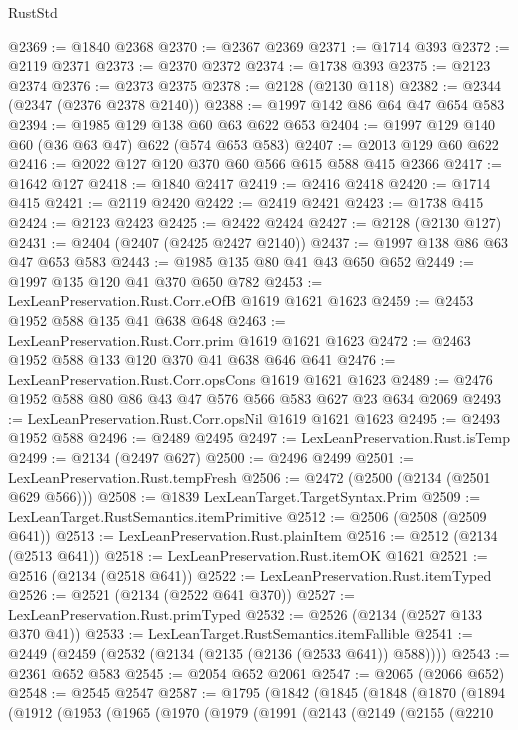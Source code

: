 \begin{lexlean}{RustStd}
\begin{coremodule}
@2369 := @1840 @2368
@2370 := @2367 @2369
@2371 := @1714 @393
@2372 := @2119 @2371
@2373 := @2370 @2372
@2374 := @1738 @393
@2375 := @2123 @2374
@2376 := @2373 @2375
@2378 := @2128 (@2130 @118)
@2382 := @2344 (@2347 (@2376 @2378 @2140))
@2388 := @1997 @142 @86 @64 @47 @654 @583
@2394 := @1985 @129 @138 @60 @63 @622 @653
@2404 := @1997 @129 @140 @60 (@36 @63 @47) @622 (@574 @653 @583)
@2407 := @2013 @129 @60 @622
@2416 := @2022 @127 @120 @370 @60 @566 @615 @588 @415 @2366
@2417 := @1642 @127
@2418 := @1840 @2417
@2419 := @2416 @2418
@2420 := @1714 @415
@2421 := @2119 @2420
@2422 := @2419 @2421
@2423 := @1738 @415
@2424 := @2123 @2423
@2425 := @2422 @2424
@2427 := @2128 (@2130 @127)
@2431 := @2404 (@2407 (@2425 @2427 @2140))
@2437 := @1997 @138 @86 @63 @47 @653 @583
@2443 := @1985 @135 @80 @41 @43 @650 @652
@2449 := @1997 @135 @120 @41 @370 @650 @782
@2453 := LexLeanPreservation.Rust.Corr.eOfB @1619 @1621 @1623
@2459 := @2453 @1952 @588 @135 @41 @638 @648
@2463 := LexLeanPreservation.Rust.Corr.prim @1619 @1621 @1623
@2472 := @2463 @1952 @588 @133 @120 @370 @41 @638 @646 @641
@2476 := LexLeanPreservation.Rust.Corr.opsCons @1619 @1621 @1623
@2489 := @2476 @1952 @588 @80 @86 @43 @47 @576 @566 @583 @627 @23 @634 @2069
@2493 := LexLeanPreservation.Rust.Corr.opsNil @1619 @1621 @1623
@2495 := @2493 @1952 @588
@2496 := @2489 @2495
@2497 := LexLeanPreservation.Rust.isTemp
@2499 := @2134 (@2497 @627)
@2500 := @2496 @2499
@2501 := LexLeanPreservation.Rust.tempFresh
@2506 := @2472 (@2500 (@2134 (@2501 @629 @566)))
@2508 := @1839 LexLeanTarget.TargetSyntax.Prim
@2509 := LexLeanTarget.RustSemantics.itemPrimitive
@2512 := @2506 (@2508 (@2509 @641))
@2513 := LexLeanPreservation.Rust.plainItem
@2516 := @2512 (@2134 (@2513 @641))
@2518 := LexLeanPreservation.Rust.itemOK @1621
@2521 := @2516 (@2134 (@2518 @641))
@2522 := LexLeanPreservation.Rust.itemTyped
@2526 := @2521 (@2134 (@2522 @641 @370))
@2527 := LexLeanPreservation.Rust.primTyped
@2532 := @2526 (@2134 (@2527 @133 @370 @41))
@2533 := LexLeanTarget.RustSemantics.itemFallible
@2541 := @2449 (@2459 (@2532 (@2134 (@2135 (@2136 (@2533 @641)) @588))))
@2543 := @2361 @652 @583
@2545 := @2054 @652 @2061
@2547 := @2065 (@2066 @652)
@2548 := @2545 @2547
@2587 := @1795
    (@1842
      (@1845
        (@1848
          (@1870
            (@1894
              (@1912
                (@1953
                  (@1965
                    (@1970
                      (@1979
                        (@1991
                          (@2143
                            (@2149
                              (@2155
                                (@2210

\end{coremodule}
\end{lexlean}
